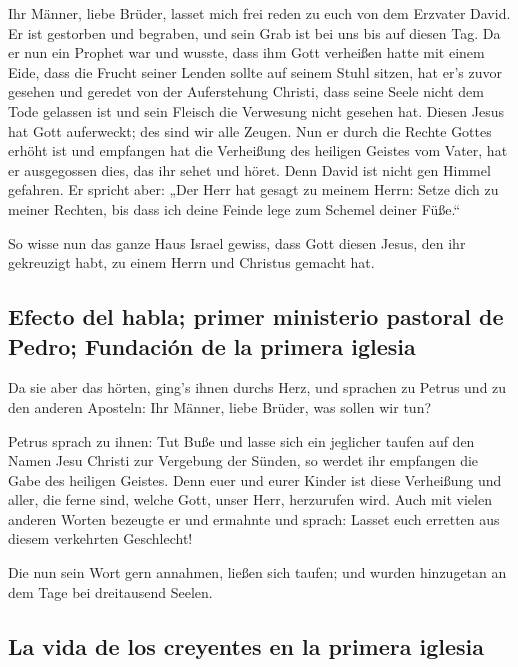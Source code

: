  Ihr Männer, liebe Brüder, lasset mich frei reden zu euch
von dem Erzvater David. Er ist gestorben und begraben, und sein Grab ist
bei uns bis auf diesen Tag.  Da er nun ein Prophet war
und wusste, dass ihm Gott verheißen hatte mit einem Eide, dass die
Frucht seiner Lenden sollte auf seinem Stuhl sitzen,  hat
er's zuvor gesehen und geredet von der Auferstehung Christi, dass seine
Seele nicht dem Tode gelassen ist und sein Fleisch die Verwesung nicht
gesehen hat.  Diesen Jesus hat Gott auferweckt; des sind
wir alle Zeugen.  Nun er durch die Rechte Gottes erhöht
ist und empfangen hat die Verheißung des heiligen Geistes vom Vater, hat
er ausgegossen dies, das ihr sehet und höret.  Denn David
ist nicht gen Himmel gefahren. Er spricht aber: „Der Herr hat gesagt zu
meinem Herrn: Setze dich zu meiner Rechten,  bis dass ich
deine Feinde lege zum Schemel deiner Füße.``

 So wisse nun das ganze Haus Israel gewiss, dass Gott
diesen Jesus, den ihr gekreuzigt habt, zu einem Herrn und Christus
gemacht hat.

\hypertarget{efecto-del-habla-primer-ministerio-pastoral-de-pedro-fundaciuxf3n-de-la-primera-iglesia}{%
\subsection{Efecto del habla; primer ministerio pastoral de Pedro;
Fundación de la primera
iglesia}\label{efecto-del-habla-primer-ministerio-pastoral-de-pedro-fundaciuxf3n-de-la-primera-iglesia}}

 Da sie aber das hörten, ging's ihnen durchs Herz, und
sprachen zu Petrus und zu den anderen Aposteln: Ihr Männer, liebe
Brüder, was sollen wir tun?

 Petrus sprach zu ihnen: Tut Buße und lasse sich ein
jeglicher taufen auf den Namen Jesu Christi zur Vergebung der Sünden, so
werdet ihr empfangen die Gabe des heiligen Geistes.  Denn
euer und eurer Kinder ist diese Verheißung und aller, die ferne sind,
welche Gott, unser Herr, herzurufen wird.  Auch mit
vielen anderen Worten bezeugte er und ermahnte und sprach: Lasset euch
erretten aus diesem verkehrten Geschlecht!

 Die nun sein Wort gern annahmen, ließen sich taufen; und
wurden hinzugetan an dem Tage bei dreitausend Seelen.

\hypertarget{la-vida-de-los-creyentes-en-la-primera-iglesia}{%
\subsection{La vida de los creyentes en la primera
iglesia}\label{la-vida-de-los-creyentes-en-la-primera-iglesia}}


